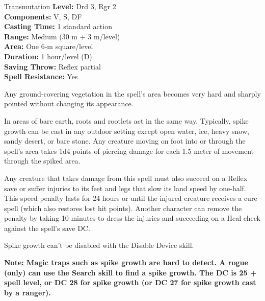 {Transmutation}
{
	\textbf{Level:}
	Drd 3, Rgr 2\\
	\textbf{Components:}
	V, S, DF\\
	\textbf{Casting Time:}
	1 standard action\\
	\textbf{Range:}
	Medium (30 m + 3 m/level)\\
	\textbf{Area:}
	One 6-m square/level\\
	\textbf{Duration:}
	1 hour/level (D)\\
	\textbf{Saving Throw:}
	Reflex partial\\
	\textbf{Spell Resistance:}
	Yes\\
}
{
	Any ground-covering vegetation in the spell's area becomes very hard and sharply pointed without changing its appearance.

	In areas of bare earth, roots and rootlets act in the same way. Typically, spike growth can be cast in any outdoor setting except open water, ice, heavy snow, sandy desert, or bare stone. Any creature moving on foot into or through the spell's area takes 1d4 points of piercing damage for each 1.5 meter of movement through the spiked area.

	Any creature that takes damage from this spell must also succeed on a Reflex save or suffer injuries to its feet and legs that slow its land speed by one-half. This speed penalty lasts for 24 hours or until the injured creature receives a cure spell (which also restores lost hit points). Another character can remove the penalty by taking 10 minutes to dress the injuries and succeeding on a Heal check against the spell's save DC.

	Spike growth can't be disabled with the Disable Device skill.

	\textbf{Note: Magic traps such as spike growth are hard to detect. A rogue (only) can use the Search skill to find a spike growth. The DC is 25 + spell level, or DC 28 for spike growth (or DC 27 for spike growth cast by a ranger).}

}

